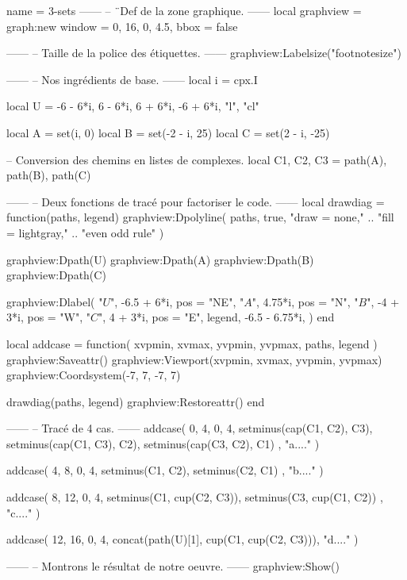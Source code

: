 \documentclass[border = 3pt]{standalone}
\begin{document}
\begin{luadraw*}{name = 3-sets}
------
-- ¨Def de la zone graphique.
------
local graphview = graph:new{
  window = {0, 16, 0, 4.5},
  bbox   = false
}

------
-- Taille de la police des étiquettes.
------
graphview:Labelsize("footnotesize")

------
-- Nos ingrédients de base.
------
local i = cpx.I

local U = {
  -6 - 6*i, 6 - 6*i, 6 + 6*i, -6 + 6*i,
  "l",
  "cl"
}

local A = set(i, 0)
local B = set(-2 - i, 25)
local C = set(2 - i, -25)

-- Conversion des chemins en listes de complexes.
local C1, C2, C3 = path(A), path(B), path(C)

------
-- Deux fonctions de tracé pour factoriser le code.
------
local drawdiag = function(paths, legend)
  graphview:Dpolyline(
    paths,
    true,
       "draw = none,"
    .. "fill = lightgray,"
    .. "even odd rule"
  )

  graphview:Dpath(U)
  graphview:Dpath(A)
  graphview:Dpath(B)
  graphview:Dpath(C)

  graphview:Dlabel(
    "$U$", -6.5 + 6*i, {pos = "NE"},
    "$A$", 4.75*i, {pos = "N"},
    "$B$", -4 + 3*i, {pos = "W"},
    "$C$", 4 + 3*i, {pos = "E"},
    legend, -6.5 - 6.75*i, {}
  )
end

local addcase = function(
    xvpmin, xvmax, yvpmin, yvpmax,
    paths,
    legend
)
  graphview:Saveattr()
    graphview:Viewport(xvpmin, xvmax, yvpmin, yvpmax)
    graphview:Coordsystem(-7, 7, -7, 7)

    drawdiag(paths, legend)
  graphview:Restoreattr()
end

------
-- Tracé de 4 cas.
------
addcase(
  0, 4, 0, 4,
  {
    setminus(cap(C1, C2), C3),
    setminus(cap(C1, C3), C2),
    setminus(cap(C3, C2), C1)
  },
  "a...."
)

addcase(
  4, 8, 0, 4,
  {
    setminus(C1, C2),
    setminus(C2, C1)
  },
  "b...."
)

addcase(
  8, 12, 0, 4,
  {
    setminus(C1, cup(C2, C3)),
    setminus(C3, cup(C1, C2))
  },
  "c...."
)

addcase(
  12, 16, 0, 4,
  concat(path(U)[1], cup(C1, cup(C2, C3))),
  "d...."
)

------
-- Montrons le résultat de notre oeuvre.
------
graphview:Show()
\end{luadraw*}
\end{document}
